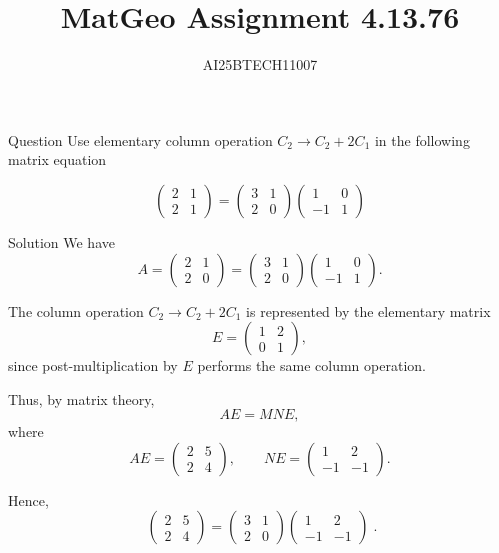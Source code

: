 \documentclass{beamer}
\title 
{MatGeo Assignment 4.13.76}
\author
{AI25BTECH11007}
\begin{document}
\frame{\titlepage}
\begin{frame}{Question}
    Use elementary column operation $C_2 \to C_2 + 2C_1$ in the following matrix equation

\[
\begin{pmatrix}
2 & 1 \\
2 & 1
\end{pmatrix}
=
\begin{pmatrix}
3 & 1 \\
2 & 0
\end{pmatrix}
\begin{pmatrix}
1 & 0 \\
-1 & 1
\end{pmatrix}
\]
\end{frame}

\begin{frame}{Solution}
    We have
\[
A=\begin{pmatrix}2&1\\2&0\end{pmatrix}
=
\begin{pmatrix}3&1\\2&0\end{pmatrix}
\begin{pmatrix}1&0\\-1&1\end{pmatrix}.
\]

The column operation $C_2 \to C_2+2C_1$ is represented by the elementary matrix
\[
E=\begin{pmatrix}1&2\\0&1\end{pmatrix},
\]
since post-multiplication by $E$ performs the same column operation.

Thus, by matrix theory,
\[
AE = MNE,
\]
where
\[
AE=\begin{pmatrix}2&5\\2&4\end{pmatrix}, \qquad
NE=\begin{pmatrix}1&2\\-1&-1\end{pmatrix}.
\]
\end{frame}

\begin{frame}
Hence,
\[
\boxed{\;
\begin{pmatrix}2&5\\2&4\end{pmatrix}
=
\begin{pmatrix}3&1\\2&0\end{pmatrix}
\begin{pmatrix}1&2\\-1&-1\end{pmatrix}
\;}.
\]
\end{frame}
\end{document}
